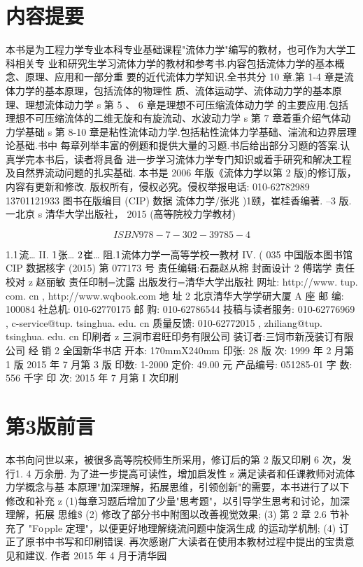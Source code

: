 
\chapter*{内容提要}
本书是为工程力学专业本科专业基础课程"流体力学"编写的教材，也可作为大学工科相关专 业和研究生学习流体力学的教材和参考书.内容包括流体力学的基本概念、原理、应用和一部分重 要的近代流体力学知识.全书共分 10 章.第 1-4 章是流体力学的基本原理，包括流体的物理性 质、流体运动学、流体动力学的基本原理、理想流体动力学 s 第 5 、 6 章是理想不可压缩流体动力学 的主要应用.包括理想不可压缩流体的二维无旋和有旋流动、水波动力学 s 第 7 章着重介绍气体动 力学基础 s 第 8-10 章是粘性流体动力学.包括粘性流体力学基础、湍流和边界层理论基础.书中 每章列举丰富的例题和提供大量的习题.书后给出部分习题的答案.认真学完本书后，读者将具备 进一步学习流体力学专门知识或着手研究和解决工程及自然界流动问题的扎实基础. 本书是 2006 年版《流体力学以第 2 版)的修订版，内容有更新和修改. 版权所有，侵权必究。侵权举报电话: 010-62782989 13701121933 图书在版编目 (CIP) 数据 流体力学/张兆 )1颐，崔桂香编著. --3 版.一北京 s 清华大学出版社， 2015 (高等院校力学教材)

\[ISBN 978-7-302-39785-4\]

1.${\rm 1}$流… II. ${\rm 1}$张… ${\rm 2}$崔… 阻.${\rm 1}$流体力学一高等学校一教材 IV. ( 035 中国版本图书馆 CIP 数据核字 (2015) 第 077173 号 责任编辑:石磊赵从棉 封面设计 2 傅瑞学 责任校对 z 赵丽敏 责任印制=沈露 出版发行=清华大学出版社 网址: http://www. tup. com. cn , http://www.wqbook.com 地 址 2 北京清华大学学研大厦 A 座 邮 编: 100084 社总机: 010-62770175 邮 购: 010-62786544 技稿与读者服务: 010-62776969 , c-service@tup. tsinghua. edu. cn 质量反馈: 010-62772015 , zhiliang@tup. tsinghua. edu. cn 印刷者 z 三洞市君旺印务有限公司 装订者:三饲市新茂装订有限公司 经 销 2 全国新华书店 开本: 170mmX240mm 印张: 28 版 次: 1999 年 2 月第 1 版 2015 年 7 月第 3 版 印数: 1-2000 定价: 49.00 元 产品编号: 051285-01 字 数: 556 千字 印 次: 2015 年 7 月第 I 次印刷

\chapter*{第3版前言}
本书向问世以来，被很多高等院校师生所采用，修订后的第 2 版又印刷 6 次，发 行1. 4 万余册. 为了进一步提高可读性，增加启发性 z 满足读者和任课教师对流体力学概念与基 本原理"加深理解，拓展思维，引领创新"的需要，本书进行了以下修改和补充 z (1)每章习题后增加了少量"思考题"，以引导学生思考和讨论，加深理解，拓展 思维\$ (2) 修改了部分书中附图以改善视觉效果; (3) 第 2 章 2.6 节补充了 "F${\rm o}$pple 定理"，以便更好地理解绕流问题中旋涡生成 的运动学机制; (4) 订正了原书中书写和印刷错误. 再次感谢广大读者在使用本教材过程中提出的宝贵意见和建议. 作者 2015 年 4 月于清华园


